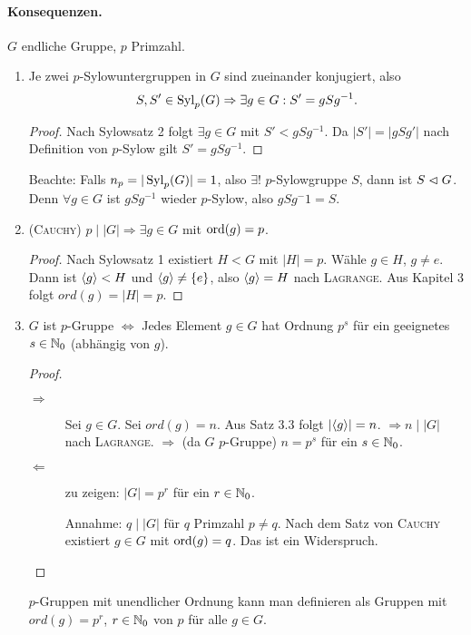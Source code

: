 \documentclass[12pt,a4paper]{scrartcl}
\begin{document}
\paragraph{Konsequenzen.}
$G$ endliche Gruppe, $p$ Primzahl.
\begin{enumerate}
	\item Je zwei $p$-Sylowuntergruppen in $G$ sind zueinander konjugiert, also \[S, S'\in \operatorname{Syl}_p(G) \Rightarrow \exists g\in G: S' = gSg^{-1}.\]
	\begin{proof}
		Nach Sylowsatz 2 folgt $\exists g\in G$ mit $S'<gSg^{-1}$. Da $|S'| = |gSg'|$ nach Definition von $p$-Sylow gilt $S' = gSg^{-1}$.
	\end{proof}
	
	Beachte: Falls $n_p  = |\operatorname{Syl}_p(G)| = 1$, also $\exists!$ $p$-Sylowgruppe $S$, dann ist $S\vartriangleleft G$. Denn $\forall g\in G$ ist $gSg^{-1}$ wieder $p$-Sylow, also $gSg^-1 = S$.
	
	\item (\textsc{Cauchy}) $p\mid|G|\Rightarrow \exists g\in G$ mit $\operatorname{ord}(g) = p$.
	\begin{proof}
		Nach Sylowsatz 1 existiert $H<G$ mit $|H| = p$. Wähle $g\in H$, $g\neq e$. Dann ist $\langle g\rangle <H$ und $\langle g\rangle \neq \{e\}$, also $\langle g\rangle = H$ nach \textsc{Lagrange}. Aus Kapitel 3 folgt $ord(g) = |H| = p$.
	\end{proof}
	\item $G$ ist $p$-Gruppe $\Leftrightarrow $ Jedes Element $g\in G$ hat Ordnung $p^s$ für ein geeignetes $s\in \mathbb N_0$ (abhängig von $g$).
	\begin{proof}~
		\begin{description}
			\item[\glqq$\Rightarrow$ \grqq] Sei $g\in G$. Sei $ord(g) = n$. Aus Satz 3.3 folgt $|\langle g\rangle| = n$. $\Rightarrow n\mid |G|$ nach \textsc{Lagrange}. $\Rightarrow$ (da $G$ $p$-Gruppe) $n = p^s$ für ein $s \in \mathbb N_0$.
			\item[\grqq $\Leftarrow$\grqq] zu zeigen: $|G| = p^r$ für ein $r\in\mathbb N_0$.
			
			Annahme: $q\mid|G|$ für $q$ Primzahl $p\neq q$. Nach dem Satz von \textsc{Cauchy} existiert $g\in G$ mit $\operatorname{ord}(g) = q$. Das ist ein Widerspruch.
		\end{description}
	\end{proof}
	\begin{bem}
		$p$-Gruppen mit unendlicher Ordnung kann man definieren als Gruppen mit $ord(g) = p^r$, $r\in \mathbb N_0$ von $p$ für alle $g\in G$.
	\end{bem}
	
\end{enumerate}
\end{document}
